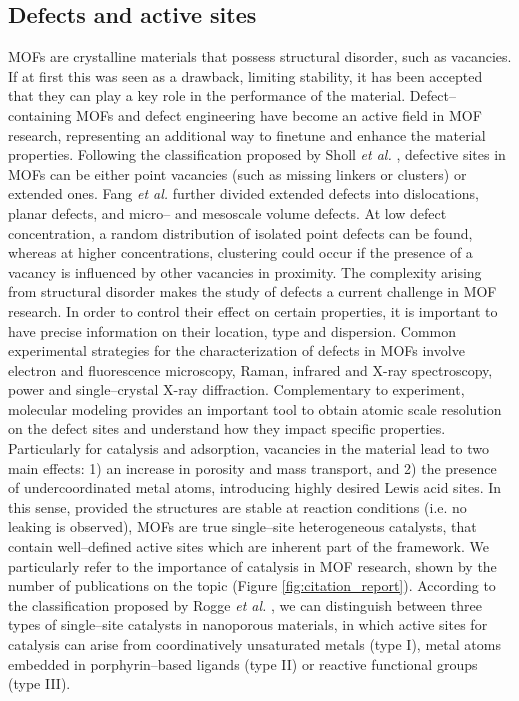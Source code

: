 \subsection*{Defects and active sites}
MOFs are crystalline materials that possess structural disorder, such as vacancies. If at first this was seen as a drawback, limiting stability, it has been accepted that they can play a key role in the performance of the material. Defect--containing MOFs and defect engineering have become an active field in MOF research, representing an additional way to finetune and enhance the material properties. 
Following the classification proposed by Sholl \textit{et al.} \cite{sholl2015defects}, defective sites in MOFs can be either point vacancies (such as missing linkers or clusters) or extended ones. Fang \textit{et al.} \cite{fang2015defect} further divided extended defects into dislocations, planar defects, and micro-- and mesoscale volume defects. 
\npar
At low defect concentration, a random distribution of isolated point defects can be found, whereas at higher concentrations, clustering could occur\cite{cliffe2014correlated} if the presence of a vacancy is influenced by other vacancies in proximity. The complexity arising from structural disorder makes the study of defects a current challenge in MOF research. In order to control their effect on certain properties, it is important to have precise information on their location, type and dispersion. Common experimental strategies for the characterization of defects in MOFs involve electron and fluorescence microscopy, Raman, infrared and X-ray spectroscopy, power and single--crystal X-ray diffraction\cite{fang2015defect}. Complementary to experiment, molecular modeling provides an important tool to obtain atomic scale resolution on the defect sites and understand how they impact specific properties.
\npar
Particularly for catalysis and adsorption, vacancies in the material lead to two main effects: 1) an increase in porosity and mass transport, and 2) the presence of undercoordinated metal atoms, introducing highly desired Lewis acid sites. 
In this sense, provided the structures are stable at reaction conditions (i.e. no leaking is observed), 
MOFs are true single--site heterogeneous catalysts, that contain well--defined active sites which are inherent part of the framework\cite{yang2019catalysis}. We particularly refer to the importance of catalysis in MOF research, shown by the number of publications on the topic (Figure \ref{fig:citation_report}). According to the classification proposed by Rogge \textit{et al.} \cite{rogge2017metal}, we can distinguish between three types of single--site catalysts in nanoporous materials, in which active sites for catalysis can arise from coordinatively unsaturated metals (type I), metal atoms embedded in porphyrin--based ligands (type II) or reactive functional groups (type III). 
